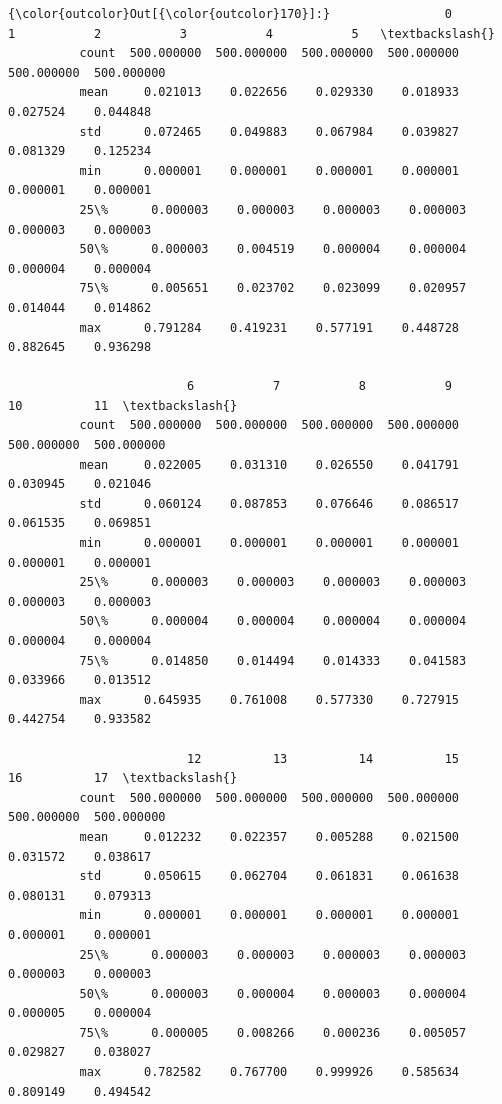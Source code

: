 \documentclass[11pt]{article}
\begin{document}
\begin{Verbatim}[commandchars=\\\{\}]
{\color{outcolor}Out[{\color{outcolor}170}]:}                0           1           2           3           4           5   \textbackslash{}
          count  500.000000  500.000000  500.000000  500.000000  500.000000  500.000000   
          mean     0.021013    0.022656    0.029330    0.018933    0.027524    0.044848   
          std      0.072465    0.049883    0.067984    0.039827    0.081329    0.125234   
          min      0.000001    0.000001    0.000001    0.000001    0.000001    0.000001   
          25\%      0.000003    0.000003    0.000003    0.000003    0.000003    0.000003   
          50\%      0.000003    0.004519    0.000004    0.000004    0.000004    0.000004   
          75\%      0.005651    0.023702    0.023099    0.020957    0.014044    0.014862   
          max      0.791284    0.419231    0.577191    0.448728    0.882645    0.936298   
          
                         6           7           8           9           10          11  \textbackslash{}
          count  500.000000  500.000000  500.000000  500.000000  500.000000  500.000000   
          mean     0.022005    0.031310    0.026550    0.041791    0.030945    0.021046   
          std      0.060124    0.087853    0.076646    0.086517    0.061535    0.069851   
          min      0.000001    0.000001    0.000001    0.000001    0.000001    0.000001   
          25\%      0.000003    0.000003    0.000003    0.000003    0.000003    0.000003   
          50\%      0.000004    0.000004    0.000004    0.000004    0.000004    0.000004   
          75\%      0.014850    0.014494    0.014333    0.041583    0.033966    0.013512   
          max      0.645935    0.761008    0.577330    0.727915    0.442754    0.933582   
          
                         12          13          14          15          16          17  \textbackslash{}
          count  500.000000  500.000000  500.000000  500.000000  500.000000  500.000000   
          mean     0.012232    0.022357    0.005288    0.021500    0.031572    0.038617   
          std      0.050615    0.062704    0.061831    0.061638    0.080131    0.079313   
          min      0.000001    0.000001    0.000001    0.000001    0.000001    0.000001   
          25\%      0.000003    0.000003    0.000003    0.000003    0.000003    0.000003   
          50\%      0.000003    0.000004    0.000003    0.000004    0.000005    0.000004   
          75\%      0.000005    0.008266    0.000236    0.005057    0.029827    0.038027   
          max      0.782582    0.767700    0.999926    0.585634    0.809149    0.494542   
          

\end{Verbatim}
\end{document}
